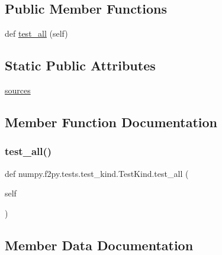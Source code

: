 \subsection*{Public Member Functions}
\begin{DoxyCompactItemize}
\item 
def \hyperlink{classnumpy_1_1f2py_1_1tests_1_1test__kind_1_1TestKind_a78a118ba7f1c4a78c4e988d7452eff13}{test\+\_\+all} (self)
\end{DoxyCompactItemize}
\subsection*{Static Public Attributes}
\begin{DoxyCompactItemize}
\item 
\hyperlink{classnumpy_1_1f2py_1_1tests_1_1test__kind_1_1TestKind_a76fb1b9ae35527d593de8bcddf7399d4}{sources}
\end{DoxyCompactItemize}


\subsection{Member Function Documentation}
\mbox{\label{classnumpy_1_1f2py_1_1tests_1_1test__kind_1_1TestKind_a78a118ba7f1c4a78c4e988d7452eff13}} 
\subsubsection{\texorpdfstring{test\+\_\+all()}{test\_all()}}
{\footnotesize\ttfamily def numpy.\+f2py.\+tests.\+test\+\_\+kind.\+Test\+Kind.\+test\+\_\+all (\begin{DoxyParamCaption}\item[{}]{self }\end{DoxyParamCaption})}



\subsection{Member Data Documentation}
\mbox{\label{classnumpy_1_1f2py_1_1tests_1_1test__kind_1_1TestKind_a76fb1b9ae35527d593de8bcddf7399d4}} 
